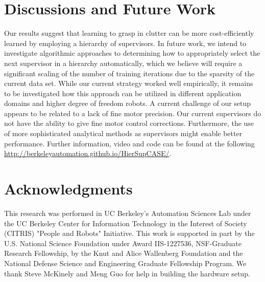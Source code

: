 \documentclass[10pt, conference]{ieeeconf}      %
\begin{document}
\section{Discussions and Future Work}
Our results suggest that learning to grasp in clutter can be more cost-efficiently learned by employing a hierarchy of
supervisors. In future work, we intend to investigate algorithmic approaches to determining how to appropriately select
the next supervisor in a hierarchy automatically, which we believe will require a significant scaling of the number of
training iterations due to the sparsity of the current data set. While our current strategy worked well empirically, it remains to be 
investigated how this approach can be utilized in different application domains and higher degree of freedom robots.
A current challenge of our setup appears to be related to a lack of fine motor precision. 
Our current supervisors do not have the ability to give fine motor control corrections. Furthermore, the use of more
sophisticated analytical methods as supervisors might enable better performance. 
Further information, video and code can be found at the following \url{http://berkeleyautomation.github.io/HierSupCASE/}. 




 \section{Acknowledgments} 
This research was performed in UC Berkeley's Automation Sciences Lab under the UC Berkeley Center for Information Technology in the Interest of Society (CITRIS) "People and Robots" Initiative. This work is supported in part by the U.S. National Science Foundation under Award IIS-1227536, NSF-Graduate Research Fellowship, by the Knut and Alice Wallenberg Foundation and the National Defense Science and Engineering Graduate Fellowship Program. We thank Steve McKinely and Meng Guo for help in building the hardware setup.  

  


\end{document}
